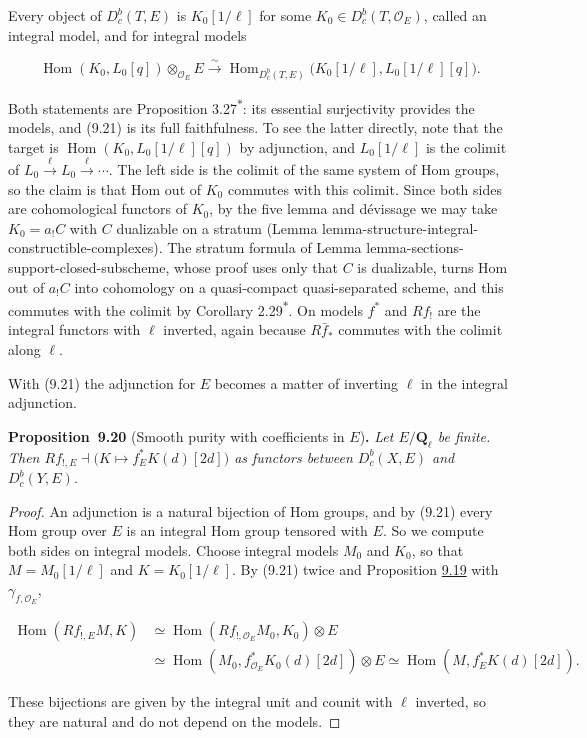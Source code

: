 \documentclass[11pt]{article}
\newenvironment{bpstatement}[2]{\par\addvspace{0.6\baselineskip}\noindent\textbf{#1}#2\textbf{.}\enspace\ignorespaces}
  {\par\addvspace{0.4\baselineskip}}
\newenvironment{bpstatementit}[2]{\begin{bpstatement}{#1}{#2}\itshape\ignorespaces}{\end{bpstatement}}
\newcommand{\bpout}[1]{#1\textsuperscript{\hyperlink{bp-outside}{\ensuremath{\ast}}}}
\providecommand{\Dbc}{}\renewcommand{\Dbc}{D^b_c}
\providecommand{\Hom}{}\renewcommand{\Hom}{\operatorname{Hom}}
\begin{document}
Every object of \(\Dbc(T,E)\) is \(K_0[1/\ell]\) for some \(K_0\in\Dbc(T,\mathcal O_E)\), called an integral model, and for integral models

\[
\Hom(K_0,L_0[q])\otimes_{\mathcal O_E}E
\xrightarrow{\sim}\Hom_{\Dbc(T,E)}\bigl(K_0[1/\ell],L_0[1/\ell][q]\bigr).
\tag{9.21}
\]

Both statements are Proposition \bpout{3.27}: its essential surjectivity provides the models, and (9.21) is its full faithfulness. To see the latter directly, note that the target is \(\Hom(K_0,L_0[1/\ell][q])\) by adjunction, and \(L_0[1/\ell]\) is the colimit of \(L_0\xrightarrow{\ell}L_0\xrightarrow{\ell}\cdots\). The left side is the colimit of the same system of Hom groups, so the claim is that Hom out of \(K_0\) commutes with this colimit. Since both sides are cohomological functors of \(K_0\), by the five lemma and dévissage we may take \(K_0=a_!C\) with \(C\) dualizable on a stratum (Lemma lemma-structure-integral-constructible-complexes). The stratum formula of Lemma lemma-sections-support-closed-subscheme, whose proof uses only that \(C\) is dualizable, turns Hom out of \(a_!C\) into cohomology on a quasi-compact quasi-separated scheme, and this commutes with the colimit by Corollary \bpout{2.29}. On models \(f^*\) and \(Rf_!\) are the integral functors with \(\ell\) inverted, again because \(R\bar f_*\) commutes with the colimit along \(\ell\).

With (9.21) the adjunction for \(E\) becomes a matter of inverting \(\ell\) in the integral adjunction.

\label{bp66}%
\begin{bpstatementit}{Proposition~9.20}{ (Smooth purity with coefficients in $E$)}
Let \(E/\mathbf Q_\ell\) be finite. Then \(Rf_{!,E}\dashv\bigl(K\mapsto f_E^*K(d)[2d]\bigr)\) as functors between \(\Dbc(X,E)\) and \(\Dbc(Y,E)\).
\end{bpstatementit}

\begin{proof}[{Proof}]\label{bp67}%
An adjunction is a natural bijection of Hom groups, and by (9.21) every Hom group over \(E\) is an integral Hom group tensored with \(E\). So we compute both sides on integral models. Choose integral models \(M_0\) and \(K_0\), so that \(M=M_0[1/\ell]\) and \(K=K_0[1/\ell]\). By (9.21) twice and Proposition \hyperref[bp61]{9.19} with \(\gamma_{f,\mathcal O_E}\),

\[
\begin{aligned}
\Hom(Rf_{!,E}M,K)&\simeq\Hom(Rf_{!,\mathcal O_E}M_0,K_0)\otimes E\\
&\simeq\Hom(M_0,f^*_{\mathcal O_E}K_0(d)[2d])\otimes E
\simeq\Hom(M,f_E^*K(d)[2d]).
\end{aligned}
\]

These bijections are given by the integral unit and counit with \(\ell\) inverted, so they are natural and do not depend on the models.
\end{proof}
\end{document}
